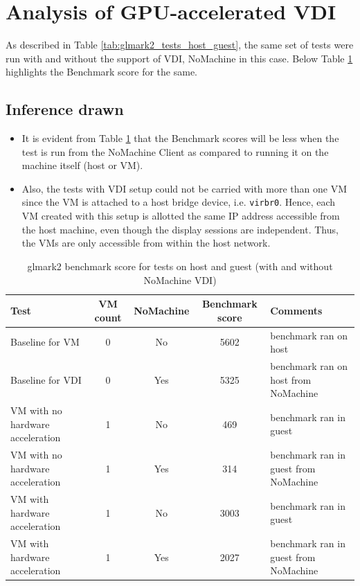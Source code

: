 \documentclass[a4paper,12pt, final]{report}
\begin{document}
\section{Analysis of GPU-accelerated VDI}
As described in Table \ref{tab:glmark2_tests_host_guest}, the same set of tests were run with and without the support of VDI, NoMachine in this case. Below Table \ref{tab:glmark2_tests_host_guest_vdi} highlights the Benchmark score for the same.

\subsection{Inference drawn}
\begin{itemize}
    \item It is evident from Table \ref{tab:glmark2_tests_host_guest_vdi} that the Benchmark scores will be less when the test is run from the NoMachine Client as compared to running it on the machine itself (host or VM).
    \item Also, the tests with VDI setup could not be carried with more than one VM since the VM is attached to a host bridge device, i.e. \verb|virbr0|. Hence, each VM created with this setup is allotted the same IP address accessible from the host machine, even though the display sessions are independent. Thus, the VMs are only accessible from within the host network.
\end{itemize}

\begin{table}[H]
\caption{glmark2 benchmark score for tests on host and guest (with and without NoMachine VDI)}
    \label{tab:glmark2_tests_host_guest_vdi}
    \centering
    \begin{tabular}{|p{3.5cm}|c|c|c|p{3.5cm}|}
        \hline
        Test & VM count & NoMachine & Benchmark score & Comments \\ \hline
        Baseline for VM & 0 & No & 5602 & benchmark ran on host \\ \hline
        Baseline for VDI & 0 & Yes & 5325 & benchmark ran on host from NoMachine \\ \hline
        VM with no hardware acceleration & 1 & No & 469 & benchmark ran in guest \\ \hline
        VM with no hardware acceleration & 1 & Yes & 314 & benchmark ran in guest from NoMachine \\ \hline
        VM with hardware acceleration & 1 & No & 3003 & benchmark ran in guest \\ \hline
        VM with hardware acceleration & 1 & Yes & 2027 & benchmark ran in guest from NoMachine \\ \hline
    \end{tabular}
\end{table}
\end{document}
